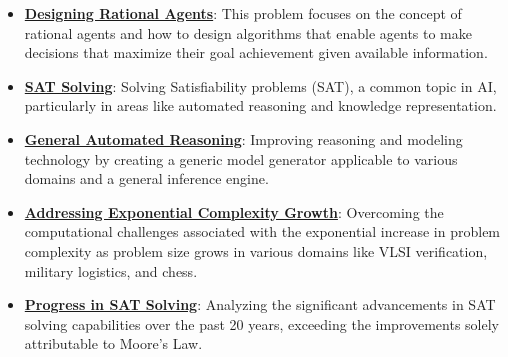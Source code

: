 \documentclass{article}%
\begin{document}
\begin{itemize}[leftmargin=*]
\item \href{https://purdue.brightspace.com/d2l/common/assets/pdfjs-d2l-dist/1.0.14-legacy/web/viewer.html?file=\%2Fcontent\%2Fenforced\%2F1095467-wl.202510.CS.24300.001\%2F14L1-DepthFS.pdf\%3Fou\%3D1095467\&lang=en-us\&container=d2l-fileviewer-rendered-pdf\&fullscreen=d2l-fileviewer-rendered-pdf-dialog\&height=667#page=39}{\textbf{Designing Rational Agents}}: This problem focuses on the concept of rational agents and how to design algorithms that enable agents to make decisions that maximize their goal achievement given available information.%
\end{itemize}%
\begin{itemize}[leftmargin=*]%
\item \href{https://purdue.brightspace.com/d2l/common/assets/pdfjs-d2l-dist/1.0.14-legacy/web/viewer.html?file=\%2Fcontent\%2Fenforced\%2F1095467-wl.202510.CS.24300.001\%2F15L2-SAT.pdf\%3Fou\%3D1095467\&lang=en-us\&container=d2l-fileviewer-rendered-pdf\&fullscreen=d2l-fileviewer-rendered-pdf-dialog\&height=667#page=2}{\textbf{SAT Solving}}: Solving Satisfiability problems (SAT), a common topic in AI, particularly in areas like automated reasoning and knowledge representation.%
\item \href{https://purdue.brightspace.com/d2l/common/assets/pdfjs-d2l-dist/1.0.14-legacy/web/viewer.html?file=\%2Fcontent\%2Fenforced\%2F1095467-wl.202510.CS.24300.001\%2F15L2-SAT.pdf\%3Fou\%3D1095467\&lang=en-us\&container=d2l-fileviewer-rendered-pdf\&fullscreen=d2l-fileviewer-rendered-pdf-dialog\&height=667#page=3}{\textbf{General Automated Reasoning}}: Improving reasoning and modeling technology by creating a generic model generator applicable to various domains and a general inference engine.%
\item \href{https://purdue.brightspace.com/d2l/common/assets/pdfjs-d2l-dist/1.0.14-legacy/web/viewer.html?file=\%2Fcontent\%2Fenforced\%2F1095467-wl.202510.CS.24300.001\%2F15L2-SAT.pdf\%3Fou\%3D1095467\&lang=en-us\&container=d2l-fileviewer-rendered-pdf\&fullscreen=d2l-fileviewer-rendered-pdf-dialog\&height=667#page=4}{\textbf{Addressing Exponential Complexity Growth}}: Overcoming the computational challenges associated with the exponential increase in problem complexity as problem size grows in various domains like VLSI verification, military logistics, and chess.%
\item \href{https://purdue.brightspace.com/d2l/common/assets/pdfjs-d2l-dist/1.0.14-legacy/web/viewer.html?file=\%2Fcontent\%2Fenforced\%2F1095467-wl.202510.CS.24300.001\%2F15L2-SAT.pdf\%3Fou\%3D1095467\&lang=en-us\&container=d2l-fileviewer-rendered-pdf\&fullscreen=d2l-fileviewer-rendered-pdf-dialog\&height=667#page=5}{\textbf{Progress in SAT Solving}}: Analyzing the significant advancements in SAT solving capabilities over the past 20 years, exceeding the improvements solely attributable to Moore's Law.%

\end{itemize}
\end{document}
